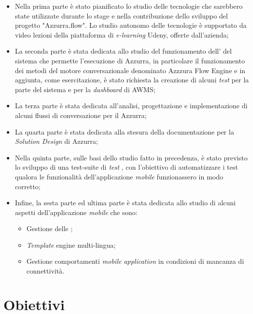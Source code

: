\begin{itemize}
	\item Nella prima parte è stato pianificato lo studio delle tecnologie che sarebbero state utilizzate durante lo stage e nella contribuzione dello sviluppo del progetto "Azzurra.flow". Lo studio autonomo delle tecnologie è supportato da video lezioni della piattaforma di \emph{e-learning} Udeny, offerte dall'azienda;
	\item La seconda parte è stata dedicata allo studio del funzionamento dell' del sistema che permette l'esecuzione di Azzurra, in particolare il funzionamento dei metodi del motore conversazionale denominato Azzzura Flow Engine e in aggiunta, come esercitazione, è stato richiesta la creazione di alcuni \emph{test}  per la parte  del sistema e per la \emph{dashboard} di \gls{AWMS};
	\item La terza parte è stata dedicata all'analisi, progettazione e implementazione di alcuni flussi di conversazione per il  Azzurra;
	\item La quarta parte è stata dedicata alla stesura della documentazione per la \emph{Solution Design} di Azzurra;
	\item Nella quinta parte, sulle basi dello studio fatto in precedenza, è stato previsto lo sviluppo di una test-suite di \emph{test} , con l'obiettivo di automatizzare i test qualora le funzionalità dell'applicazione \emph{mobile} funzionassero in modo corretto;
	\item Infine, la sesta parte ed ultima parte è stata dedicata allo studio di alcuni aspetti dell'applicazione \emph{mobile} che sono:
		\begin{itemize}
			\item Gestione delle \textcolor{SchoolColor}{\ap{[g]}};
			\item \emph{Template} engine multi-lingua;
			\item Gestione comportamenti \emph{mobile} \emph{application} in condizioni di mancanza di connettività.
		\end{itemize}
\end{itemize}



\section{Obiettivi}

